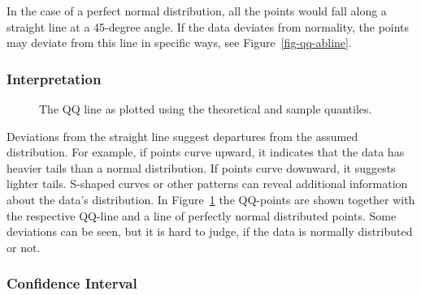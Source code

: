 \documentclass[
  a4paper,
]{scrbook}
\begin{document}
In the case of a perfect normal distribution, all the points would fall
along a straight line at a 45-degree angle. If the data deviates from
normality, the points may deviate from this line in specific ways, see
Figure~\ref{fig-qq-abline}.

\subsubsection{Interpretation}\label{interpretation}

\begin{figure}[H]


\caption{\label{fig-qq-line}The QQ line as plotted using the theoretical
and sample quantiles.}

\end{figure}%

Deviations from the straight line suggest departures from the assumed
distribution. For example, if points curve upward, it indicates that the
data has heavier tails than a normal distribution. If points curve
downward, it suggests lighter tails. S-shaped curves or other patterns
can reveal additional information about the data's distribution. In
Figure~\ref{fig-qq-line} the QQ-points are shown together with the
respective QQ-line and a line of perfectly normal distributed points.
Some deviations can be seen, but it is hard to judge, if the data is
normally distributed or not.

\subsubsection{Confidence Interval}\label{confidence-interval}
\end{document}
